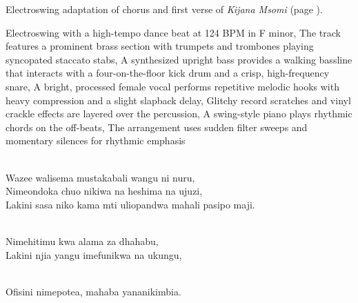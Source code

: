 
\begin{notes}
Electroswing adaptation of chorus and first verse of \emph{Kijana Msomi} (page \pageref{sec:kijana-msomi}).
\end{notes}
\begin{style}
Electroswing with a high-tempo dance beat at 124 BPM in F minor, The track features a prominent brass section with trumpets and trombones playing syncopated staccato stabs, A synthesized upright bass provides a walking bassline that interacts with a four-on-the-floor kick drum and a crisp, high-frequency snare, A bright, processed female vocal performs repetitive melodic hooks with heavy compression and a slight slapback delay, Glitchy record scratches and vinyl crackle effects are layered over the percussion, A swing-style piano plays rhythmic chords on the off-beats, The arrangement uses sudden filter sweeps and momentary silences for rhythmic emphasis
\end{style}
\begin{lyrics}
\\
Wazee walisema mustakabali wangu ni nuru,
\\
Nimeondoka chuo nikiwa na heshima na ujuzi,
\\
Lakini sasa niko kama mti uliopandwa mahali pasipo maji.

\\
Nimehitimu kwa alama za dhahabu,\\
Lakini njia yangu imefunikwa na ukungu,

\\
Ofisini nimepotea, mahaba yananikimbia.
\end{lyrics}

